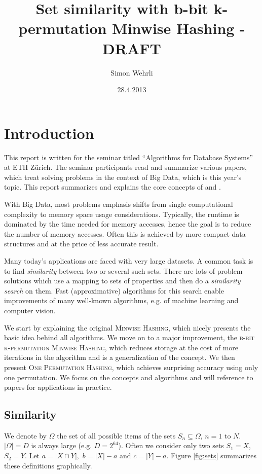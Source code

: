 \documentclass[a4paper]{article}
\author{Simon Wehrli}
\date{28.4.2013}
\title{Set similarity with b-bit k-permutation Minwise Hashing - DRAFT}
\begin{document}
 
\maketitle

\section{Introduction}
This report is written for the seminar titled ``Algorithms for Database Systems'' at ETH Z\"{u}rich. The seminar participants read and summarize various papers, which treat solving problems in the context of Big Data, which is this year's topic. This report summarizes and explains the core concepts of \citep{LiK11} and \citep{LiOwZhang12}.

With Big Data, most problems emphasis shifts from single computational complexity to memory space usage considerations. Typically, the runtime is dominated by the time needed for memory accesses, hence the goal is to reduce the number of memory accesses. Often this is achieved by more compact data structures and at the price of less accurate result.

Many today's applications are faced with very large datasets. A common task is to find \emph{similarity} between two or several such sets. There are lots of problem solutions which use a mapping to sets of properties and then do a \emph{similarity search} on them. Fast (approximative) algorithms for this search enable improvements of many well-known algorithms, e.g. of machine learning and computer vision.

We start by explaining the original \textsc{Minwise Hashing}, which nicely presents the basic idea behind all algorithms. We move on to a major improvement, the \textsc{b-bit k-permutation Minwise Hashing}, which reduces storage at the cost of more iterations in the algorithm and is a generalization of the concept. We then present \textsc{One Permutation Hashing}, which achieves surprising accuracy using only one permutation. We focus on the concepts and algorithms and will reference to papers for applications in practice.

\subsection{Similarity}
We denote by $\Omega$ the set of all possible items of the sets $S_n \subseteq \Omega$, $n = 1 \text{ to } N$. $\left| \Omega \right| = D$ is always large (e.g. $D=2^{64}$). Often we consider only two sets $S_1 = X$, $S_2 = Y$. Let $a=|X \cap Y|,$ $b=|X|-a$ and $c=|Y|-a$. Figure \vref{fig:sets} summarizes these definitions graphically.
\end{document}
